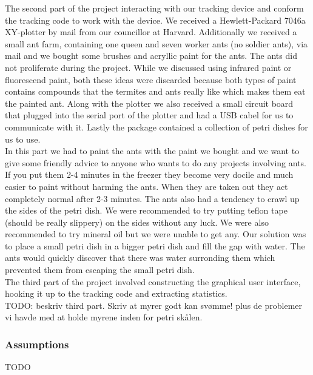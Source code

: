 The second part of the project interacting with our tracking device and conform the tracking code to work with the device. We received a Hewlett-Packard 7046a XY-plotter by mail from our councillor at Harvard. Additionally we received a small ant farm, containing one queen and seven worker ants (no soldier ants), via mail and we bought some brushes and acryllic paint for the ants. The ants did not proliferate during the project. While we discussed using infrared paint or fluorescend paint, both these ideas were discarded because both types of paint contains compounds that the termites and ants really like which makes them eat the painted ant. Along with the plotter we also received a small circuit board that plugged into the serial port of the plotter and had a USB cabel for us to communicate with it. Lastly the package contained a collection of petri dishes for us to use. \\

In this part we had to paint the ants with the paint we bought and we want to give some friendly advice to anyone who wants to do any projects involving ants. If you put them 2-4 minutes in the freezer they become very docile and much easier to paint without harming the ants. When they are taken out they act completely normal after 2-3 minutes. The ants also had a tendency to crawl up the sides of the petri dish. We were recommended to try putting teflon tape (should be really slippery) on the sides without any luck. We were also recommended to try mineral oil but we were unable to get any. Our solution was to place a small petri dish in a bigger petri dish and fill the gap with water. The ants would quickly discover that there was water surronding them which prevented them from escaping the small petri dish. \\

The third part of the project involved constructing the graphical user interface, hooking it up to the tracking code and extracting statistics.  \\

TODO: beskriv third part. Skriv at myrer godt kan svømme! plus de problemer vi havde med at holde myrene inden for petri skålen.  

\subsubsection{Assumptions} \mbox{}\par

TODO

